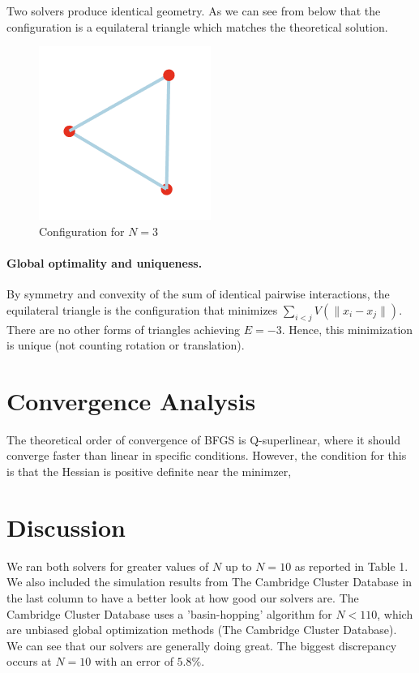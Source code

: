 \documentclass[11pt,onecolumn]{article}
\begin{document}
Two solvers produce identical geometry. As we can see from below that the configuration is a equilateral triangle which matches the theoretical solution.
\begin{figure}[h]
  \centering
  \includegraphics[width=0.5\textwidth]{N3.png}
  \caption{Configuration for \(N=3\)}
\end{figure}

\paragraph{Global optimality and uniqueness.}  
By symmetry and convexity of the sum of identical pairwise interactions, the equilateral triangle is the configuration that minimizes \(\sum_{i<j}V(\|x_i-x_j\|)\).  There are no other forms of triangles achieving \(E=-3\).  Hence, this minimization is unique (not counting rotation or translation).

\section{Convergence Analysis}

The theoretical order of convergence of BFGS is Q-superlinear, where it should converge faster than linear in specific conditions. However, the condition for this is that the Hessian is positive definite near the minimzer, 

\section{Discussion}
We ran both solvers for greater values of $N$ up to $N=10$ as reported in Table 1. We also included the simulation results from The Cambridge Cluster Database in the last column to have a better look at how good our solvers are. The Cambridge Cluster Database uses a 'basin-hopping' algorithm for $N<110$, which are unbiased global optimization methods (The Cambridge Cluster Database). We can see that our solvers are generally doing great. The biggest discrepancy occurs at $N=10$ with an error of $5.8\%$.
\end{document}
